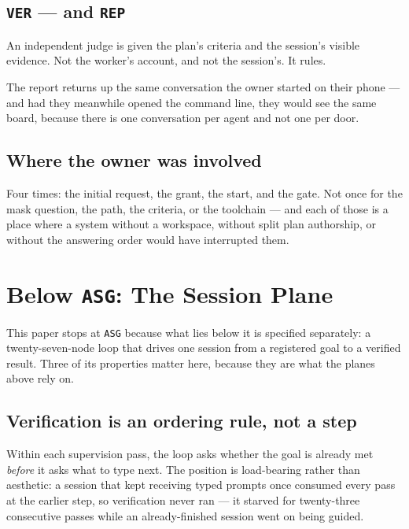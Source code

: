 \documentclass[11pt]{article}
\newcommand{\code}[1]{\texttt{\small #1}}
\begin{document}
\subsection{\code{VER} --- and \code{REP}}

An independent judge is given the plan's criteria and the session's visible evidence. Not the worker's account, and not the session's. It rules.

The report returns up the same conversation the owner started on their phone --- and had they meanwhile opened the command line, they would see the same board, because there is one conversation per agent and not one per door.

\subsection{Where the owner was involved}

Four times: the initial request, the grant, the start, and the gate. Not once for the mask question, the path, the criteria, or the toolchain --- and each of those is a place where a system without a workspace, without split plan authorship, or without the answering order would have interrupted them.

\section{Below \code{ASG}: The Session Plane}
\label{sec:below}

This paper stops at \code{ASG} because what lies below it is specified separately: a twenty-seven-node loop that drives one session from a registered goal to a verified result. Three of its properties matter here, because they are what the planes above rely on.

\subsection{Verification is an ordering rule, not a step}

Within each supervision pass, the loop asks whether the goal is already met \emph{before} it asks what to type next. The position is load-bearing rather than aesthetic: a session that kept receiving typed prompts once consumed every pass at the earlier step, so verification never ran --- it starved for twenty-three consecutive passes while an already-finished session went on being guided.
\end{document}
